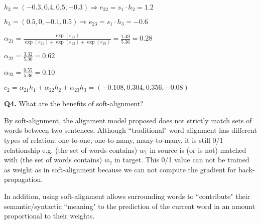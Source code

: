 \documentclass{article}
\begin{document}
$h_2=(-0.3,0.4,0.5,-0.3) \Rightarrow e_{22}=s_1\cdot h_2=1.2$

$h_3=(0.5,0,-0.1,0.5) \Rightarrow e_{23}=s_1\cdot h_3=-0.6$

$\alpha_{21}=\frac{\exp(e_{21})}{\exp(e_{21})+\exp(e_{22})+\exp(e_{23})}=\frac{1.49}{5.36}=0.28$

$\alpha_{22}=\frac{3.32}{5.36}=0.62$

$\alpha_{23}=\frac{0.55}{5.36}=0.10$

$c_2=\alpha_{21}h_1+\alpha_{22}h_2+\alpha_{23}h_3=(-0.108,0.304,0.356,-0.08)$

\bigskip

\textbf{Q4.} What are the benefits of soft-alignment?

By soft-alignment, the alignment model proposed does not strictly match sets of words between two sentences. Although ``traditional" word alignment has different types of relation: one-to-one, one-to-many, many-to-many, it is still 0/1 relationship e.g. (the set of words contains) $w_1$ in source is (or is not) matched with (the set of words contains) $w_2$ in target. This 0/1 value can not be trained as weight as in soft-alignment because we can not compute the gradient for back-propagation.

In addition, using soft-alignment allows surrounding words to ``contribute" their semantic/syntactic ``meaning" to the prediction of the current word in an amount proportional to their weights.
\end{document}
